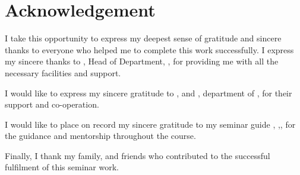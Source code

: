 \chapter*{\centering Acknowledgement}%
%


I take this opportunity to express my deepest sense of gratitude and sincere
thanks to everyone who helped me to complete this work successfully. I express
my sincere thanks to \textbf{ \hod}, Head of Department, \dept,
\college\hspace*{2pt} \collegeplace \hspace*{2pt} for providing me with all the
necessary facilities and support.

I would like to express my sincere gratitude to \textbf{\semcordinatorA},
\textbf{\semcordinatorB} and \textbf{\semcordinatorC}, department of
\hspace*{2pt} \dept, \hspace*{2pt} \college \hspace*{2pt} \collegeplace
\hspace*{2pt} for their support and co-operation. %

I would like to place on record my sincere gratitude to my seminar guide
\textbf{\guide},
\hspace*{2pt}\guidedes,\hspace*{2pt}\dept,\hspace*{2pt}\college
\hspace*{2pt}\collegeplace \hspace*{2pt} for the guidance and mentorship
throughout the course.

Finally, I thank my family, and friends who contributed to the successful
fulfilment of this seminar work.

\vspace*{30pt}
\begin{flushright}
    \textbf{\author}
\end{flushright}
\thispagestyle{plain}